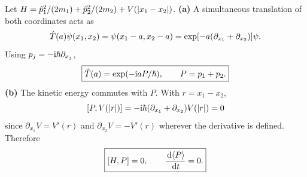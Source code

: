 Let
$H=\hat p_1^2/(2m_1)+\hat p_2^2/(2m_2)+
V(|x_1-x_2|)$.
\textbf{(a)} A simultaneous translation
of both coordinates acts as
\begin{equation}
\hat T(a)\psi(x_1,x_2)
=\psi(x_1-a,x_2-a)
=\exp[-a(\partial_{x_1}+\partial_{x_2})]\psi.
\end{equation}
Using $p_j=-\mathrm i\hbar\partial_{x_j}$,
\[
\boxed{\hat T(a)=\exp(-\mathrm i aP/\hbar),\qquad
P=p_1+p_2.}
\]
\textbf{(b)} The kinetic energy
commutes with $P$.
With $r=x_1-x_2$,
\[
[P,V(|r|)]=-\mathrm i\hbar
(\partial_{x_1}+\partial_{x_2})V(|r|)
=0
\]
since $\partial_{x_1}V=V'(r)$ and
$\partial_{x_2}V=-V'(r)$ wherever
the derivative is defined. Therefore
\begin{equation}
\boxed{[H,P]=0,\qquad
\frac{\,\mathrm d\langle P\rangle}{\,\mathrm d t}=0.}
\end{equation}
